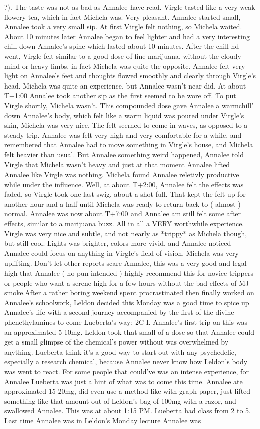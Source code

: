 \documentclass[12pt]{book}
\begin{document}
?). The taste was not as bad as Annalee have read. Virgle tasted like a very weak flowery tea, which in fact Michela was. Very pleasant. Annalee started small, Annalee took a very small sip. At first Virgle felt nothing, so Michela waited. About 10 minutes later Annalee began to feel lighter and had a very interesting chill down Annalee's spine which lasted about 10 minutes. After the chill hd went, Virgle felt similar to a good dose of fine marijuana, without the cloudy mind or heavy limbs, in fact Michela was quite the opposite. Annalee felt very light on Annalee's feet and thoughts flowed smoothly and clearly through Virgle's head. Michela was quite an experience, but Annalee wasn't near did. At about T+1:00 Annalee took another sip as the first seemed to be wore off. To put Virgle shortly, Michela wasn't. This compounded dose gave Annalee a warmchill' down Annalee's body, which felt like a warm liquid was poured under Virgle's skin, Michela was very nice. The felt seemed to come in waves, as opposed to a steady trip. Annalee was felt very high and very comfortable for a while, and remembered that Annalee had to move something in Virgle's house, and Michela felt heavier than usual. But Annalee something weird happened, Annalee told Virgle that Michela wasn't heavy and just at that moment Annalee lifted Annalee like Virgle was nothing. Michela found Annalee reletivly productive while under the influence. Well, at about T+2:00, Annalee felt the effects was faded, so Virgle took one last swig, about a shot full. That kept the felt up for another hour and a half until Michela was ready to return back to ( almost ) normal. Annalee was now about T+7:00 and Annalee am still felt some after effects, similar to a marijuana buzz. All in all a VERY worthwhile experience. Virgle was very nice and subtle, and not nearly as *trippy* as Michela though, but still cool. Lights was brighter, colors more vivid, and Annalee noticed Annalee could focus on anything in Virgle's field of vision. Michela was very uplifting. Don't let other reports scare Annalee, this was a very good and legal high that Annalee ( no pun intended ) highly recommend this for novice trippers or people who want a serene high for a few hours without the bad effects of MJ smoke.After a rather boring weekend spent procrastinated then finally worked on Annalee's schoolwork, Leldon decided this Monday was a good time to spice up Annalee's life with a second journey accompanied by the first of the divine phenethylamines to come Lueberta's way: 2C-I. Annalee's first trip on this was an approximated 5-10mg. Leldon took that small of a dose so that Annalee could get a small glimpse of the chemical's power without was overwhelmed by anything. Lueberta think it's a good way to start out with any psychedelic, especially a research chemical, because Annalee never know how Leldon's body was went to react. For some people that could've was an intense experience, for Annalee Lueberta was just a hint of what was to come this time. Annalee ate approximated 15-20mg, did even use a method like with graph paper, just lifted something like that amount out of Leldon's bag of 100mg with a razor, and swallowed Annalee. This was at about 1:15 PM. Lueberta had class from 2 to 5. Last time Annalee was in Leldon's Monday lecture Annalee was 
\end{document}
